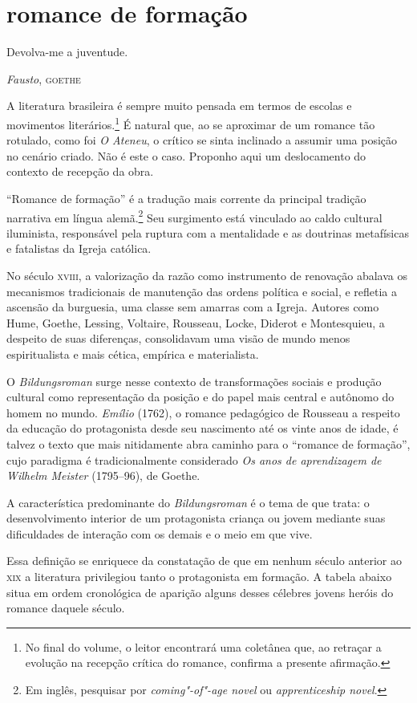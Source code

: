 \section*{romance de formação}

\epigraph{Devolva-me a juventude.}{\textit{Fausto}, \textsc{goethe}}

A literatura brasileira é sempre muito pensada em termos
de escolas e movimentos literários.\footnote{ No final do volume, o
leitor encontrará uma coletânea que, ao retraçar a evolução na recepção
crítica do romance, confirma a presente afirmação.} É
natural que, ao se aproximar de um romance tão rotulado, como foi
\textit{O Ateneu}, o crítico se sinta
inclinado a assumir uma posição no cenário criado. Não é este o caso.
Proponho aqui um deslocamento do contexto de recepção da obra.

``Romance de formação'' é a tradução mais corrente da
principal tradição narrativa em língua alemã.\footnote{Em inglês,
pesquisar por \textit{coming"-of"-age novel} ou
\textit{apprenticeship novel}.} Seu surgimento está
vinculado ao caldo cultural iluminista, responsável pela ruptura com a
mentalidade e as doutrinas metafísicas e fatalistas da Igreja católica.


No século \textsc{xviii}, a valorização da razão como instrumento de renovação
abalava os mecanismos tradicionais de manutenção das ordens política e
social, e refletia a ascensão da burguesia, uma classe sem amarras com
a Igreja. Autores como Hume, Goethe, Lessing, Voltaire, Rousseau,
Locke, Diderot e Montesquieu, a despeito de suas diferenças,
consolidavam uma visão de mundo menos espiritualista e mais cética,
empírica e materialista.


O \textit{Bildungsroman} surge nesse contexto de transformações sociais e produção cultural como
representação da posição e do papel mais central e autônomo do homem no
mundo. \textit{Emílio} (1762), o romance
pedagógico de Rousseau a respeito da educação do protagonista desde seu
nascimento até os vinte anos de idade, é talvez o texto que mais
nitidamente abra caminho para o ``romance de formação'', cujo paradigma é
tradicionalmente considerado \textit{Os anos de aprendizagem
de Wilhelm Meister} (1795--96), de Goethe.


A característica predominante do
\textit{Bildungsroman} é o tema de que
trata: o desenvolvimento interior de um protagonista criança ou jovem
mediante suas dificuldades de interação com os demais e o meio em que vive. 

Essa definição se enriquece da constatação de que em nenhum século
anterior ao \textsc{xix} a literatura privilegiou tanto o protagonista em
formação. A tabela abaixo situa em ordem cronológica de aparição alguns
desses célebres jovens heróis do romance daquele século.


